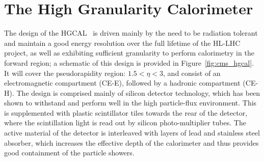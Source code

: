 \section{The High Granularity Calorimeter}\label{sec:hgcal}
The design of the HGCAL~\cite{CERN-LHCC-2017-023} is driven mainly by the need to be radiation tolerant and maintain a good energy resolution over the full lifetime of the HL-LHC project, as well as exhibiting sufficient granularity to perform calorimetry in the forward region; a schematic of this design is provided in Figure~\ref{fig:cms_hgcal}. It will cover the pseudorapidity region: $1.5<\eta<3$, and  consist of an electromagnetic compartment (CE-E), followed by a hadronic compartment (CE-H). The design is comprised mainly of silicon detector technology, which has been shown to withstand and perform well in the high particle-flux environment. This is supplemented with plastic scintillator tiles towards the rear of the detector, where the scintillation light is read out by silicon photo-multiplier tubes. The active material of the detector is interleaved with layers of lead and stainless steel absorber, which increases the effective depth of the calorimeter and thus provides good containment of the particle showers.

